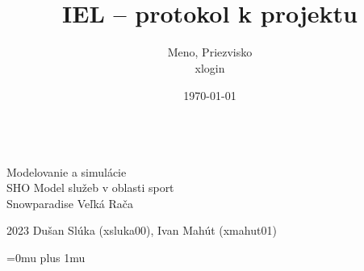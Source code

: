 \documentclass[slovak]{fitiel}
\title{\logo\\IEL -- protokol k projektu}
\author{Meno, Priezvisko \\ xlogin}
\date{\today} %
\begin{document}
	\begin{titlepage}
		\onecolumn
		\begin{center}
			{\logo\\}
			{\LARGE Modelovanie a simulácie\\SHO Model služeb v oblasti sport\\[0.4em] 
			\Huge Snowparadise Veľká Rača}\\
		\end{center}
		{\Large 2023 \hfill Dušan Slúka (xsluka00), Ivan Mahút (xmahut01)}
	\end{titlepage}
	\clearpage
	\tableofcontents
	
	\newpage

	 

	 

	

	

	

	

	
	\pagebreak
	\Urlmuskip=0mu plus 1mu\relax
	
	

	
	
\end{document}
